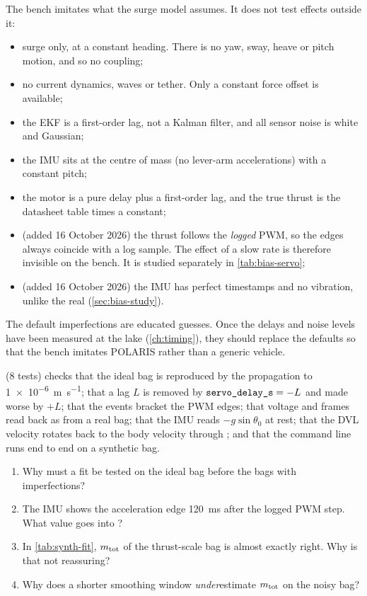 The bench imitates what the surge model assumes. It does not test effects outside it:
\begin{itemize}[nosep]
  \item surge only, at a constant heading. There is no yaw, sway, heave or pitch motion, and so
        no coupling;
  \item no current dynamics, waves or tether. Only a constant force offset is available;
  \item the EKF is a first-order lag, not a Kalman filter, and all sensor noise is white and Gaussian;
  \item the IMU sits at the centre of mass (no lever-arm accelerations) with a constant pitch;
  \item the motor is a pure delay plus a first-order lag, and the true thrust is the
        datasheet table times a constant;
  \item (added 16 October 2026) the thrust follows the \emph{logged} PWM, so the edges always
        coincide with a log sample. The effect of a slow  rate is therefore
        invisible on the bench. It is studied separately in \cref{tab:bias-servo};
  \item (added 16 October 2026) the IMU has perfect timestamps and no vibration, unlike the real
         (\cref{sec:bias-study}).
\end{itemize}
The default imperfections are educated guesses. Once the delays and noise levels have been measured
at the lake (\cref{ch:timing}), they should replace the defaults so that the bench imitates
POLARIS rather than a generic vehicle.

\begin{incode}
 (8 tests) checks that the ideal bag is reproduced by the
propagation to \qty{1e-6}{\meter\per\second}; that a lag $L$ is removed by
$\code{servo_delay_s} = -L$ and made worse by $+L$; that the events bracket the PWM edges; that
voltage and frames read back as from a real bag; that the IMU reads $-g\sin\theta_0$ at rest;
that the DVL velocity rotates back to the body velocity through ; and that the
 command line runs end to end on a synthetic bag.
\end{incode}

\begin{questions}
\begin{enumerate}
  \item Why must a fit be tested on the ideal bag before the bags with imperfections?
  \item The IMU shows the acceleration edge \qty{120}{\milli\second} after the logged PWM step. What
        value goes into ?
  \item In \cref{tab:synth-fit}, $m_\mathrm{tot}$ of the thrust-scale bag is almost exactly right. Why is
        that not reassuring?
  \item Why does a shorter smoothing window \emph{under}estimate $m_\mathrm{tot}$ on the noisy bag?
\end{enumerate}
\end{questions}

